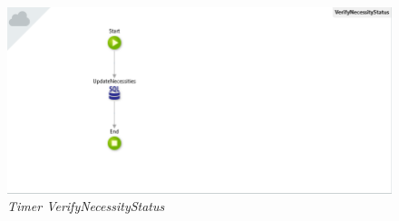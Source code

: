 \begin{figure}[H]
  \centering 
  \includegraphics[scale=0.4]{figures/timer3.png}
  \caption{\textit{Timer VerifyNecessityStatus}}\label{fig:timer3}
\end{figure}
